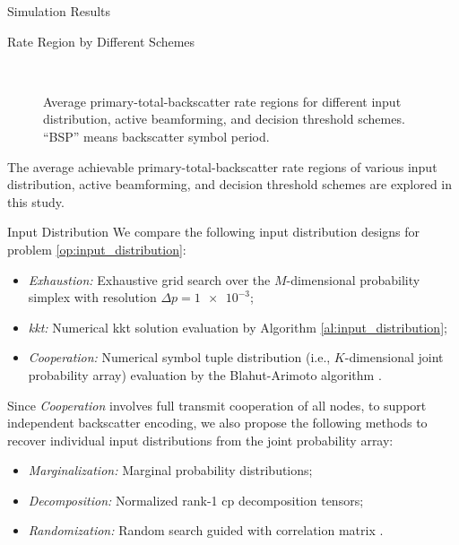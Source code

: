 \documentclass[journal]{IEEEtran}
\begin{document}
\begin{section}{Simulation Results}
	\begin{subsection}{Rate Region by Different Schemes}
		\begin{figure}[!t]
			\centering
			\\
			\caption{
				Average primary-total-backscatter rate regions for different input distribution, active beamforming, and decision threshold schemes.
				``BSP'' means backscatter symbol period.
			}
		\end{figure}
		The average achievable primary-total-backscatter rate regions of various input distribution, active beamforming, and decision threshold schemes are explored in this study.

		\begin{subsubsection}{Input Distribution}
			We compare the following input distribution designs for problem \eqref{op:input_distribution}:
			\begin{itemize}
				\item \emph{Exhaustion:} Exhaustive grid search over the $M$-dimensional probability simplex with resolution $\Delta p = \num{1e-3}$;
				\item \emph{\gls{kkt}:} Numerical \gls{kkt} solution evaluation by Algorithm \ref{al:input_distribution};
				\item \emph{Cooperation:} Numerical symbol tuple distribution (i.e., $K$-dimensional joint probability array) evaluation by the Blahut-Arimoto algorithm \cite{Arimoto1972,Blahut1972a}.
			\end{itemize}

			Since \emph{Cooperation} involves full transmit cooperation of all nodes, to support independent backscatter encoding, we also propose the following methods to recover individual input distributions from the joint probability array:
			\begin{itemize}
				\item \emph{Marginalization:} Marginal probability distributions;
				\item \emph{Decomposition:} Normalized rank-\num{1} \gls{cp} decomposition tensors;
				\item \emph{Randomization:} Random search guided with correlation matrix \cite{Calvo2010}.
			\end{itemize}


\end{subsubsection}
\end{subsection}
\end{section}
\end{document}
